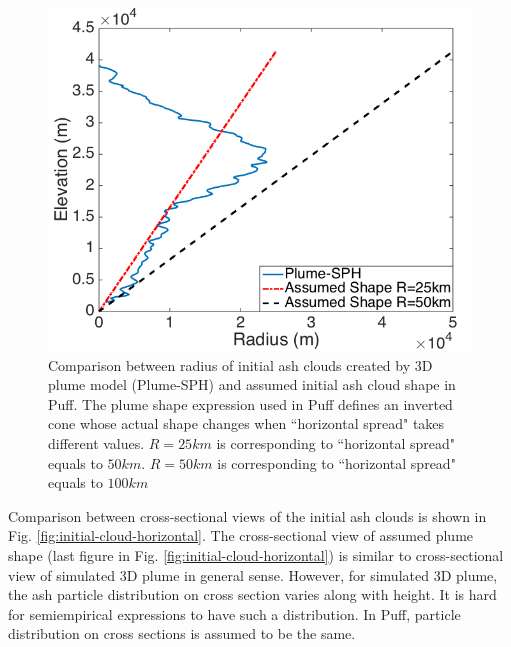 \documentclass[draft,linenumbers]{agujournal2019}
\begin{document}
\begin{figure}[!htb]
   \centering
   \includegraphics[width=0.50 \textwidth]{Figures/radius-Plume-SPH-And-Assumed}  
   \caption{Comparison between radius of initial ash clouds created by 3D plume model (Plume-SPH) and assumed initial ash cloud shape in Puff. The plume shape expression used in Puff defines an inverted cone whose actual shape changes when ``horizontal spread" takes different values. $R=25km$ is corresponding to ``horizontal spread" equals to $50km$. $R=50km$ is corresponding to ``horizontal spread" equals to $100km$}
    \label{fig:radius-comparison}
\end{figure}

Comparison between cross-sectional views of the initial ash clouds is shown in Fig. \ref{fig:initial-cloud-horizontal}. The cross-sectional view of assumed plume shape (last figure in Fig. \ref{fig:initial-cloud-horizontal}) is similar to cross-sectional view of simulated 3D plume in general sense. However, for simulated 3D plume, the ash particle distribution on cross section varies along with height. It is hard for semiempirical expressions to have such a distribution. In Puff, particle distribution on cross sections is assumed to be the same. 
\end{document}
